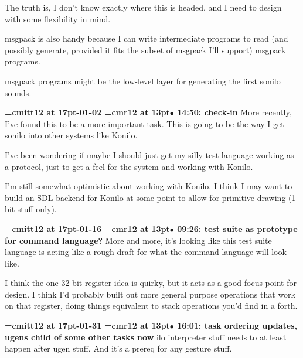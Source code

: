The truth is, I don't know exactly where this is headed, and I need to design with some flexibility in mind.
\par

msgpack is also handy because I can write intermediate programs to read (and possibly generate, provided it fits the subset of msgpack I'll support) msgpack programs.
\par

msgpack programs might be the low-level layer for generating the first sonilo sounds.
\par

{\medskip\noindent\bf\font\titlefont=cmitt12 at 17pt-01-02}\medskip
{\smallskip\noindent\bf\font\titlefont=cmr12 at 13pt\titlefont $\bullet$ 14:50: check-in}\smallskip
More recently, I've found this to be a more important task. This is going to be the way I get sonilo into other systems like Konilo.
\par

I've been wondering if maybe I should just get my silly test language working as a protocol, just to get a feel for the system and working with Konilo.
\par

I'm still somewhat optimistic about working with Konilo. I think I may want to build an SDL backend for Konilo at some point to allow for primitive drawing (1-bit stuff only).
\par

{\medskip\noindent\bf\font\titlefont=cmitt12 at 17pt-01-16}\medskip
{\smallskip\noindent\bf\font\titlefont=cmr12 at 13pt\titlefont $\bullet$ 09:26: test suite as prototype for command language?}\smallskip
More and more, it's looking like this test suite language is acting like a rough draft for what the command language will look like.
\par

I think the one 32-bit register idea is quirky, but it acts as a good focus point for design. I think I'd probably built out more general purpose operations that work on that register, doing things equivalent to stack operations you'd find in a forth.
\par

{\medskip\noindent\bf\font\titlefont=cmitt12 at 17pt-01-31}\medskip
{\smallskip\noindent\bf\font\titlefont=cmr12 at 13pt\titlefont $\bullet$ 16:01: task ordering updates, ugens child of some other tasks now}\smallskip
ilo interpreter stuff needs to at least happen after ugen stuff. And it's a prereq for any gesture stuff.
\par

